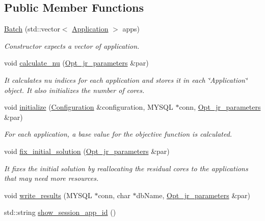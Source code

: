 \subsection*{Public Member Functions}
\begin{DoxyCompactItemize}
\item 
\hyperlink{classBatch_aea459d16c99c2f02af53b3ad5b0ff12d}{Batch} (std\-::vector$<$ \hyperlink{classApplication}{Application} $>$ apps)
\begin{DoxyCompactList}\small\item\em Constructor expects a vector of application. \end{DoxyCompactList}\item 
void \hyperlink{classBatch_a5174213a71d9f45cc10fee6bacd04b09}{calculate\-\_\-nu} (\hyperlink{classOpt__jr__parameters}{Opt\-\_\-jr\-\_\-parameters} \&par)
\begin{DoxyCompactList}\small\item\em It calculates nu indices for each application and stores it in each \char`\"{}\-Application\char`\"{} object. It also initializes the number of cores. \end{DoxyCompactList}\item 
void \hyperlink{classBatch_a025d1f919a65cda556c99db8b6cdff42}{initialize} (\hyperlink{classConfiguration}{Configuration} \&configuration, M\-Y\-S\-Q\-L $\ast$conn, \hyperlink{classOpt__jr__parameters}{Opt\-\_\-jr\-\_\-parameters} \&par)
\begin{DoxyCompactList}\small\item\em For each application, a base value for the objective function is calculated. \end{DoxyCompactList}\item 
void \hyperlink{classBatch_a2af18c30d72b6598eba353e8daef0b80}{fix\-\_\-initial\-\_\-solution} (\hyperlink{classOpt__jr__parameters}{Opt\-\_\-jr\-\_\-parameters} \&par)
\begin{DoxyCompactList}\small\item\em It fixes the initial solution by reallocating the residual cores to the applications that may need more resources. \end{DoxyCompactList}\item 
void \hyperlink{classBatch_a5e45cac0fbad47fde645547351fe3c75}{write\-\_\-results} (M\-Y\-S\-Q\-L $\ast$conn, char $\ast$db\-Name, \hyperlink{classOpt__jr__parameters}{Opt\-\_\-jr\-\_\-parameters} \&par)
\item 
std\-::string \hyperlink{classBatch_a7bb052d7d9fd3cfe1a00ebd60f977afb}{show\-\_\-session\-\_\-app\-\_\-id} ()

\end{DoxyCompactItemize}
